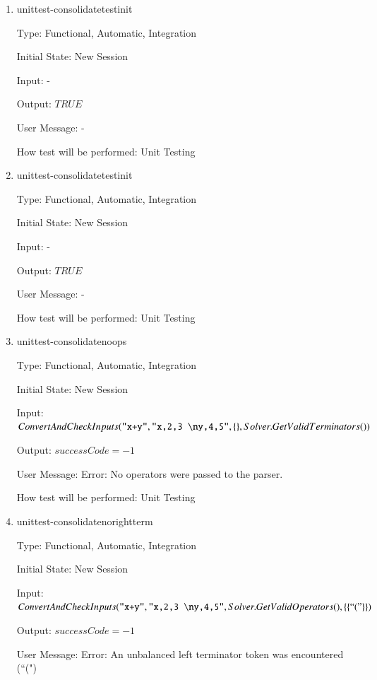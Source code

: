 \documentclass[12pt, titlepage]{article}
\begin{document}
\begin{enumerate}
	
	\item{unittest-consolidatetestinit}
	
	Type: Functional, Automatic, Integration
	
	Initial State: New Session
	
	Input: -
	
	Output: $TRUE$
	
	User Message: -
	
	How test will be performed: Unit Testing\\
	
	\item{unittest-consolidatetestinit}
	
	Type: Functional, Automatic, Integration
	
	Initial State: New Session
	
	Input: -
	
	Output: $TRUE$
	
	User Message: -
	
	How test will be performed: Unit Testing\\
	
	\item{unittest-consolidatenoops}
	
	Type: Functional, Automatic, Integration
	
	Initial State: New Session
	
	Input: $ConvertAndCheckInputs(\texttt{"x+y"}, \texttt{"x,2,3 \textbackslash 
		ny,4,5"}, \{ \},\\ Solver.GetValidTerminators())$
	
	Output: $successCode = -1$
	
	User Message: Error: No operators were passed to the parser.
	
	How test will be performed: Unit Testing\\
	
	\item{unittest-consolidatenorightterm}
	
	Type: Functional, Automatic, Integration
	
	Initial State: New Session
	
	Input: $ConvertAndCheckInputs(\texttt{"x+y"}, \texttt{"x,2,3 \textbackslash 
		ny,4,5"},\\ Solver.GetValidOperators(), \{ \{ ``(" \} \})$
	
	Output: $successCode = -1$
	
	User Message: Error: An unbalanced left terminator token was encountered 
	(``(")
	

\end{enumerate}
\end{document}
